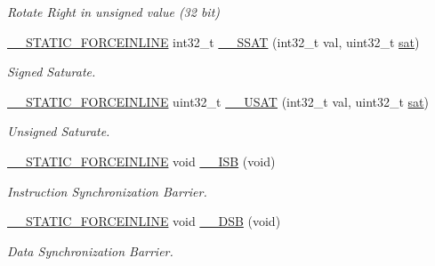 \begin{DoxyCompactItemize}
\begin{DoxyCompactList}\small\item\em Rotate Right in unsigned value (32 bit) \end{DoxyCompactList}\item 
\mbox{\hyperlink{cmsis__iccarm_8h_ab904513442afdf77d4f8c74f23cbb040}{\+\_\+\+\_\+\+S\+T\+A\+T\+I\+C\+\_\+\+F\+O\+R\+C\+E\+I\+N\+L\+I\+NE}} int32\+\_\+t \mbox{\hyperlink{group___c_m_s_i_s___core___instruction_interface_ga372c0535573dde3e37f0f08c774a3487}{\+\_\+\+\_\+\+S\+S\+AT}} (int32\+\_\+t val, uint32\+\_\+t \mbox{\hyperlink{group___c_m_s_i_s___core___instruction_interface_gaafcad33f86db3a8e1f55925989f9d2dc}{sat}})
\begin{DoxyCompactList}\small\item\em Signed Saturate. \end{DoxyCompactList}\item 
\mbox{\hyperlink{cmsis__iccarm_8h_ab904513442afdf77d4f8c74f23cbb040}{\+\_\+\+\_\+\+S\+T\+A\+T\+I\+C\+\_\+\+F\+O\+R\+C\+E\+I\+N\+L\+I\+NE}} uint32\+\_\+t \mbox{\hyperlink{group___c_m_s_i_s___core___instruction_interface_ga6562dbd8182d1571e22dbca7ebdfa9bc}{\+\_\+\+\_\+\+U\+S\+AT}} (int32\+\_\+t val, uint32\+\_\+t \mbox{\hyperlink{group___c_m_s_i_s___core___instruction_interface_gaafcad33f86db3a8e1f55925989f9d2dc}{sat}})
\begin{DoxyCompactList}\small\item\em Unsigned Saturate. \end{DoxyCompactList}\item 
\mbox{\hyperlink{cmsis__iccarm_8h_ab904513442afdf77d4f8c74f23cbb040}{\+\_\+\+\_\+\+S\+T\+A\+T\+I\+C\+\_\+\+F\+O\+R\+C\+E\+I\+N\+L\+I\+NE}} void \mbox{\hyperlink{group___c_m_s_i_s___core___instruction_interface_gae26c2b3961e702aeabc24d4984ebd369}{\+\_\+\+\_\+\+I\+SB}} (void)
\begin{DoxyCompactList}\small\item\em Instruction Synchronization Barrier. \end{DoxyCompactList}\item 
\mbox{\hyperlink{cmsis__iccarm_8h_ab904513442afdf77d4f8c74f23cbb040}{\+\_\+\+\_\+\+S\+T\+A\+T\+I\+C\+\_\+\+F\+O\+R\+C\+E\+I\+N\+L\+I\+NE}} void \mbox{\hyperlink{group___c_m_s_i_s___core___instruction_interface_ga7fe277f5385d23b9c44b2cbda1577ce9}{\+\_\+\+\_\+\+D\+SB}} (void)
\begin{DoxyCompactList}\small\item\em Data Synchronization Barrier. \end{DoxyCompactList}\item 

\end{DoxyCompactItemize}

